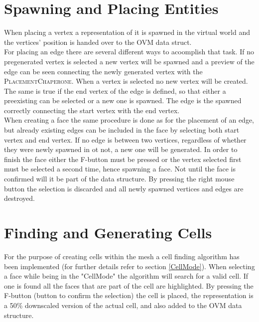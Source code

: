 \documentclass{report}
\begin{document}
	\section{Spawning and Placing Entities}
	\startsection
		When placing a vertex a representation of it is spawned in the virtual world and the vertices' position is handed over to the OVM data struct. \\
		For placing an edge there are several different ways to acoomplish that task. If no pregenerated vertex is selected a new vertex will be spawned and a preview of the edge can be seen connecting the newly generated vertex with the \textsc{PlacementChaperone}. When a vertex is selected no new vertex will be created. The same is true if the end vertex of the edge is defined, so that either a preexisting can be selected or a new one is spawned. The edge is the spawned correctly connecting the start vertex with the end vertex. \\
		When creating a face the same procedure is done as for the placement of an edge, but already existing edges can be included in the face by selecting both start vertex and end vertex. If no edge is between two vertices, regardless of whether they were newly spawned in ot not, a new one will be generated. In order to finish the face either the F-button must be pressed or the vertex selected first must be selected a second time, hence spawning a face. Not until the face is confirmed will it be part of the data structure. By pressing the right mouse button the selection is discarded and all newly spawned vertices and edges are destroyed.
	\closesection
	
	\section{Finding and Generating Cells}
	\startsection
		For the purpose of creating cells within the mesh a cell finding algorithm has been implemented (for further details refer to section \ref{CellMode}). When selecting a face while being in the "CellMode" the algorithm will search for a valid cell. If one is found all the faces that are part of the cell are highlighted. By pressing the F-button (button to confirm the selection) the cell is placed, the representation is a 50\% downscaled version of the actual cell, and also added to the OVM data structure.
	\closesection
	
\end{document}
